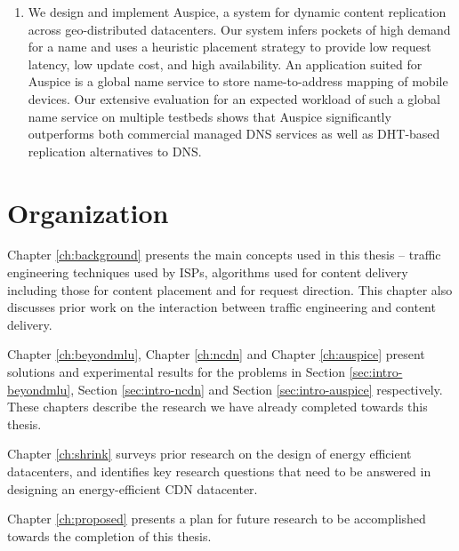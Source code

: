 \begin{enumerate}
\item
We design and implement  Auspice, a system for dynamic content replication across geo-distributed datacenters. Our system infers pockets of high demand for a name and uses a heuristic placement strategy to provide low request latency, low update cost, and high availability. 
An application suited for Auspice is a global name service to store name-to-address mapping of mobile devices. Our extensive evaluation for an expected workload of such a global name service on multiple testbeds shows that Auspice significantly outperforms both commercial managed DNS services as well as DHT-based replication alternatives to DNS. 
\end{enumerate}



\section{Organization}
Chapter \ref{ch:background} presents the main concepts used in this thesis -- traffic engineering techniques used by ISPs, algorithms used for content delivery including those for content placement and for request direction. This chapter also discusses prior work on the interaction between traffic engineering and content delivery. 

Chapter \ref{ch:beyondmlu}, Chapter \ref{ch:ncdn} and Chapter \ref{ch:auspice} present solutions and experimental results for the problems in Section \ref{sec:intro-beyondmlu}, Section \ref{sec:intro-ncdn} and  Section \ref{sec:intro-auspice} respectively. These chapters describe the research we have already completed towards this thesis. 

Chapter \ref{ch:shrink} surveys prior research on the design of energy efficient datacenters, and identifies key research questions that need to be answered in designing an energy-efficient CDN datacenter.

Chapter \ref{ch:proposed} presents a plan for future research to be accomplished towards the completion of this thesis.


%
%
%


